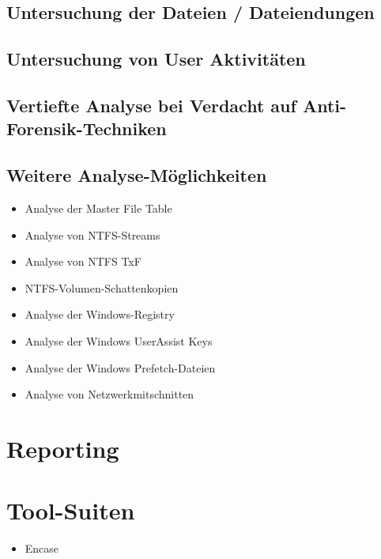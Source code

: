 \subsection{Untersuchung der Dateien / Dateiendungen}

\subsection{Untersuchung von User Aktivitäten}

\subsection{Vertiefte Analyse bei Verdacht auf Anti-Forensik-Techniken}

\subsection{Weitere Analyse-Möglichkeiten}
\begin{itemize}
\item Analyse der Master File Table
\item Analyse von NTFS-Streams
\item Analyse von NTFS TxF
\item NTFS-Volumen-Schattenkopien
\item Analyse der Windows-Registry
\item Analyse der Windows UserAssist Keys
\item Analyse der Windows Prefetch-Dateien
\item Analyse von Netzwerkmitschnitten
\end{itemize}

\section{Reporting}






\section{Tool-Suiten}
\begin{itemize}
\item Encase
\end{itemize}


